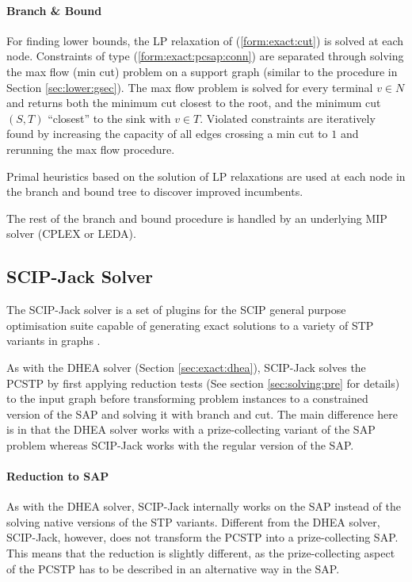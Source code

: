 \paragraph{Branch \& Bound}

For finding lower bounds, the LP relaxation of (\ref{form:exact:cut}) is solved at each node.
Constraints of type (\ref{form:exact:pcsap:conn}) are separated through solving the max flow (min cut)
problem on a support graph (similar to the procedure in Section \ref{sec:lower:gsec}). 
The max flow problem is solved for every terminal $v \in N$ and returns both the minimum cut closest to
the root, and the minimum cut $(S,T)$ ``closest'' to the sink with $v \in T$.
Violated constraints are iteratively found by increasing the
capacity of all edges crossing a min cut to $1$ and rerunning the max flow procedure.

Primal heuristics based on the solution of LP relaxations are used at each node in the branch and bound
tree to discover improved incumbents.

The rest of the branch and bound procedure is handled by an underlying MIP solver (CPLEX or LEDA).
\subsection{SCIP-Jack Solver}
\label{sec:exact:scipj}
The SCIP-Jack solver is a set of plugins for the SCIP general purpose optimisation suite capable
of generating exact solutions to a variety of STP variants in graphs \cite{gamrath2017scip}.

As with the DHEA solver (Section \ref{sec:exact:dhea}), SCIP-Jack solves the PCSTP by first applying
reduction tests (See section \ref{sec:solving:pre} for details) to the input graph before transforming problem
instances to a constrained version of the SAP and solving it with branch and cut.
The main difference here is in that the DHEA solver works with a prize-collecting variant
 of the SAP problem whereas SCIP-Jack works with the regular version of the SAP.

\paragraph{Reduction to SAP}
As with the DHEA solver, SCIP-Jack internally works on the SAP instead of the solving native
versions of the STP variants. Different from the DHEA solver, SCIP-Jack, however, does not
transform the PCSTP into a prize-collecting SAP. This means that the reduction is slightly
different, as the prize-collecting aspect of the PCSTP has to be described in an alternative
way in the SAP.

